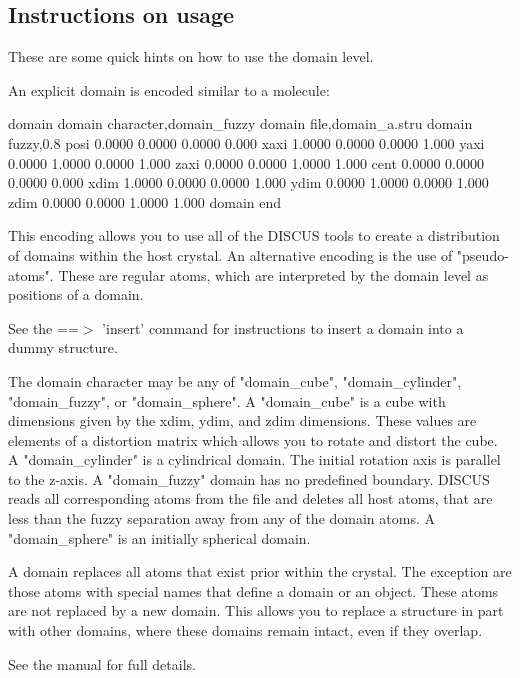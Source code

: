 \subsection*{Instructions on usage}
\par
These are some quick hints on how to use the domain level. 
\par
An explicit domain is encoded similar to a molecule: 
\par
domain 
domain character,domain\_fuzzy 
domain file,domain\_a.stru 
domain fuzzy,0.8 
posi      0.0000     0.0000    0.0000  0.000 
xaxi      1.0000     0.0000    0.0000  1.000 
yaxi      0.0000     1.0000    0.0000  1.000 
zaxi      0.0000     0.0000    1.0000  1.000 
cent      0.0000     0.0000    0.0000  0.000 
xdim      1.0000     0.0000    0.0000  1.000 
ydim      0.0000     1.0000    0.0000  1.000 
zdim      0.0000     0.0000    1.0000  1.000 
domain end 
\par
This encoding allows you to use all of the DISCUS tools to create a 
distribution of domains within the host crystal. An alternative 
encoding is the use of "pseudo-atoms". These are regular atoms, which are 
interpreted by the domain level as positions of a domain. 
\par
See the ==$> $ 'insert' command for instructions to insert a domain into 
a dummy structure. 
\par
The domain character may be any of "domain\_cube", "domain\_cylinder", 
"domain\_fuzzy", or "domain\_sphere". 
A "domain\_cube" is a cube with dimensions given by the xdim, ydim, 
and zdim dimensions. These values are elements of a distortion matrix 
which allows you to rotate and distort the cube. 
A "domain\_cylinder" is a cylindrical domain. The initial rotation 
axis is parallel to the z-axis. 
A "domain\_fuzzy" domain has no predefined boundary. DISCUS reads all 
corresponding atoms from the file and deletes all host atoms, that 
are less than the fuzzy separation away from any of the domain atoms. 
A "domain\_sphere" is an initially spherical domain. 
\par
A domain replaces all atoms that exist prior within the crystal. 
The exception are those atoms with special names that define a 
domain or an object. These atoms are not replaced by a new domain. 
This allows you to replace a structure in part with other domains, 
where these domains remain intact, even if they overlap. 
\par
\par
See the manual for full details. 
\par

